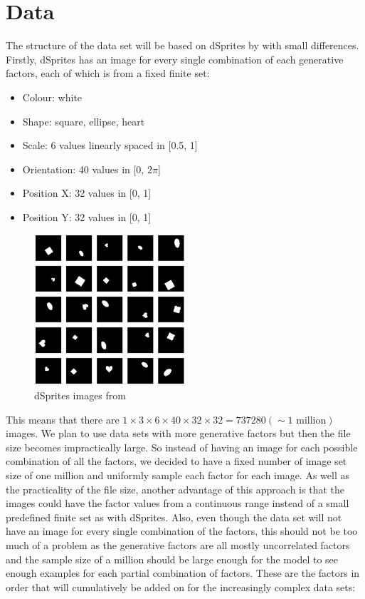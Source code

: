     \section{Data} \label{sec:data}
        The structure of the data set will be based on dSprites by \cite{dsprites17} with small differences. Firstly, dSprites has an image for every single combination of each generative factors, each of which is from a fixed finite set:
        
        \begin{itemize}
            \item Colour: white
            \item Shape: square, ellipse, heart
            \item Scale: 6 values linearly spaced in [0.5, 1]
            \item Orientation: 40 values in [0, $2\pi$]
            \item Position X: 32 values in [0, 1]
            \item Position Y: 32 values in [0, 1]
        \end{itemize}
        
        \begin{figure}[H]
            \centering
            \includegraphics[width=0.5\textwidth]{imgs/dSprites.png}
            \caption{dSprites images from \cite{dsprites17}}
            \label{fig:colour_scale}
        \end{figure}
        
        This means that there are $1 \times 3 \times 6 \times 40 \times 32 \times 32 = 737280(\sim 1 \text{ million})$ images. We plan to use data sets with more generative factors but then the file size becomes impractically large. So instead of having an image for each possible combination of all the factors, we decided to have a fixed number of image set size of one million and uniformly sample each factor for each image. As well as the practicality of the file size, another advantage of this approach is that the images could have the factor values from a continuous range instead of a small predefined finite set as with dSprites. Also, even though the data set will not have an image for every single combination of the factors, this should not be too much of a problem as the generative factors are all mostly uncorrelated factors and the sample size of a million should be large enough for the model to see enough examples for each partial combination of factors. These are the factors in order that will cumulatively be added on for the increasingly complex data sets:
        
